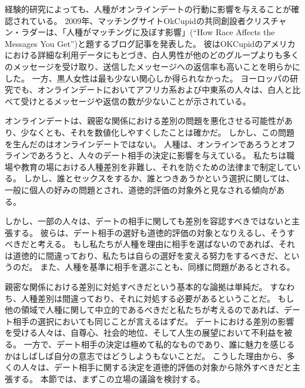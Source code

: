 \documentclass[paper=a4,book,openany]{jlreq}
\begin{document}
経験的研究によっても、人種がオンラインデートの行動に影響を与えることが確認されている。
2009年、マッチングサイトOkCupidの共同創設者クリスチャン・ラダーは、「人種がマッチングに及ぼす影響」(``How Race Affects the Messages You Get'')と題するブログ記事を発表した。
彼はOKCupidのアメリカにおける詳細な利用データにもとづき、白人男性が他のどのグループよりも多くのメッセージを受け取り、送信したメッセージへの返信率も高いことを明らかにした。
一方、黒人女性は最も少ない関心しか得られなかった\citep[pp. 101-109]{rudder14:_datac}。
ヨーロッパの研究でも、オンラインデートにおいてアフリカ系および中東系の人々は、白人と比べて受けとるメッセージや返信の数が少ないことが示されている\citep[p. 332]{potarca15:_racial_prefer_onlin_datin_europ_count}。

オンラインデートは、親密な関係における差別の問題を悪化させる可能性があり、少なくとも、それを数値化しやすくしたことは確かだ。
しかし、この問題を生んだのはオンラインデートではない。
人種は、オンラインであろうとオフラインであろうと、人々のデート相手の決定に影響を与えている。
私たちは職場や教育の場における人種差別を非難し、それを防ぐための法律まで制定している。
しかし、誰とセックスをするか、誰とつきあうかという選択に関しては、一般に個人の好みの問題とされ、道徳的評価の対象外と見なされる傾向がある。

しかし、一部の人々は、デートの相手に関しても差別を容認すべきではないと主張する。
彼らは、デート相手の選好も道徳的評価の対象となりえるし、そうすべきだと考える。
もし私たちが人種を理由に相手を選ばないのであれば、それは道徳的に間違っており、私たちは自らの選好を変える努力をするべきだ、というのだ。
また、人種を基準に相手を選ぶことも、同様に問題があるとされる。

親密な関係における差別に対処すべきだという基本的な論拠は単純だ。
すなわち、人種差別は間違っており、それに対処する必要があるということだ。
もし他の領域で人種に関して中立的であるべきだと私たちが考えるのであれば、デート相手の選択においても同じことが言えるはずだ。
デートにおける差別の影響を受ける人々は、自尊心、社会的地位、そして人生の展望において不利益を被る。
一方で、デート相手の決定は極めて私的なものであり、誰に魅力を感じるかはしばしば自分の意志ではどうしようもないことだ。
こうした理由から、多くの人々は、デート相手に関する決定を道徳的評価の対象から除外すべきだと主張する。
本節では、まずこの立場の議論を検討する。
\end{document}
